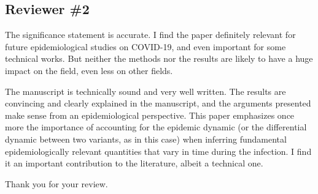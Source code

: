 \documentclass[12pt]{article}
\newcommand{\rev}{\subsection*}
\newcommand{\revtext}{\textsf}
\begin{document}
\rev{Reviewer \#2}

\revtext{The significance statement is accurate. I find the paper definitely relevant for future epidemiological studies on COVID-19, and even important for some technical works. But neither the methods nor the results are likely to have a huge impact on the field, even less on other fields.}

\revtext{The manuscript is technically sound and very well written. The results are convincing and clearly explained in the manuscript, and the arguments presented make sense from an epidemiological perspective. This paper emphasizes once more the importance of accounting for the epidemic dynamic (or the differential dynamic between two variants, as in this case) when inferring fundamental epidemiologically relevant quantities that vary in time during the infection. I find it an important contribution to the literature, albeit a technical one.}

Thank you for your review.


\end{document}
